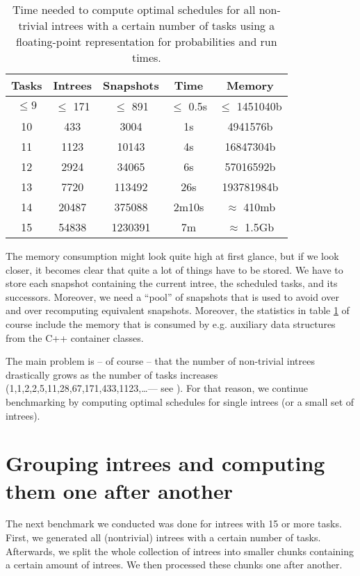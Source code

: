 \begin{table}[ht]
  \centering
  \begin{tabular}[ht]{ccccc}
    Tasks & Intrees & Snapshots & Time & Memory \\
    \hline{}
    $\leq 9$ & $\leq$ 171 & $\leq$ 891 & $\leq$ 0.5s & $\leq$ 1451040b \\
    10 & 433 & 3004 & 1s & 4941576b \\
    11 & 1123 & 10143 & 4s & 16847304b \\
    12 & 2924 & 34065 & 6s & 57016592b \\
    13 & 7720 & 113492 & 26s & 193781984b \\
    14 & 20487 & 375088 & 2m10s & $\approx$ 410mb \\
    15 & 54838 & 1230391 & 7m & $\approx$ 1.5Gb \\
    
  \end{tabular}
  \caption{Time needed to compute optimal schedules for all non-trivial intrees with a certain number of tasks using a floating-point representation for probabilities and run times.}
  \label{tab:time-benchmark}
\end{table}

The memory consumption might look quite high at first glance, but if we look closer, it becomes clear that quite a lot of things have to be stored. We have to store each snapshot containing the current intree, the scheduled tasks, and its successors. Moreover, we need a ``pool'' of snapshots that is used to avoid over and over recomputing equivalent snapshots. Moreover, the statistics in table \ref{tab:time-benchmark} of course include the memory that is consumed by e.g. auxiliary data structures from the C++ container classes.

The main problem is -- of course -- that the number of non-trivial intrees drastically grows as the number of tasks increases (1,1,2,2,5,11,28,67,171,433,1123,\dots --- see \cite{oeisnumbernontrivialintrees}). For that reason, we continue benchmarking by computing optimal schedules for single intrees (or a small set of intrees).

\section{Grouping intrees and computing them one after another}
\label{sec:benchmarks-clustered-intrees}

The next benchmark we conducted was done for intrees with 15 or more tasks. First, we generated all (nontrivial) intrees with a certain number of tasks. Afterwards, we split the whole collection of intrees into smaller chunks containing a certain amount of intrees. We then processed these chunks one after another. 

